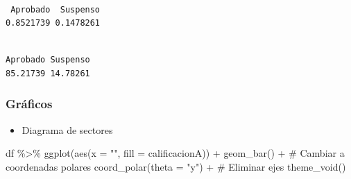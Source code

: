 \documentclass[
  a4paper,
]{scrreport}
\newenvironment{Shaded}{\begin{snugshade}}{\end{snugshade}}
\newcommand{\AttributeTok}[1]{\textcolor[rgb]{0.40,0.45,0.13}{#1}}
\newcommand{\CommentTok}[1]{\textcolor[rgb]{0.37,0.37,0.37}{#1}}
\newcommand{\DecValTok}[1]{\textcolor[rgb]{0.68,0.00,0.00}{#1}}
\newcommand{\FunctionTok}[1]{\textcolor[rgb]{0.28,0.35,0.67}{#1}}
\newcommand{\NormalTok}[1]{\textcolor[rgb]{0.00,0.23,0.31}{#1}}
\newcommand{\SpecialCharTok}[1]{\textcolor[rgb]{0.37,0.37,0.37}{#1}}
\newcommand{\StringTok}[1]{\textcolor[rgb]{0.13,0.47,0.30}{#1}}
\providecommand{\tightlist}{%
  \setlength{\itemsep}{0pt}\setlength{\parskip}{0pt}}\usepackage{longtable,booktabs,array}
\theoremstyle{definition}
\theoremstyle{definition}
\theoremstyle{remark}
\begin{document}
\begin{verbatim}

 Aprobado  Suspenso 
0.8521739 0.1478261 
\end{verbatim}

\begin{Shaded}
\end{Shaded}

\begin{verbatim}

Aprobado Suspenso 
85.21739 14.78261 
\end{verbatim}

\hypertarget{gruxe1ficos-1}{%
\subsubsection{Gráficos}\label{gruxe1ficos-1}}

\begin{itemize}
\tightlist
\item
  Diagrama de sectores
\end{itemize}

\begin{Shaded}
\begin{Highlighting}[]
\NormalTok{df }\SpecialCharTok{\%\textgreater{}\%} \FunctionTok{ggplot}\NormalTok{(}\FunctionTok{aes}\NormalTok{(}\AttributeTok{x =} \StringTok{""}\NormalTok{, }\AttributeTok{fill =}\NormalTok{ calificacionA)) }\SpecialCharTok{+} 
  \FunctionTok{geom\_bar}\NormalTok{() }\SpecialCharTok{+}
  \CommentTok{\# Cambiar a coordenadas polares}
  \FunctionTok{coord\_polar}\NormalTok{(}\AttributeTok{theta =} \StringTok{"y"}\NormalTok{) }\SpecialCharTok{+}
  \CommentTok{\# Eliminar ejes}
   \FunctionTok{theme\_void}\NormalTok{()}
\end{Highlighting}
\end{Shaded}
\end{document}
